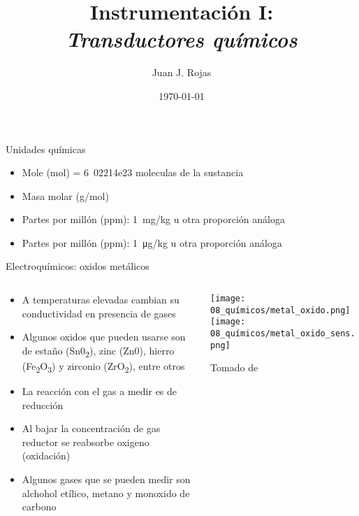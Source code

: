 \documentclass[aspectratio=169]{beamer}
\title{Instrumentación I: \\ \emph{Transductores químicos}}
\author{
    Juan J. Rojas
}
\institute{Instituto Tecnológico de Costa Rica}
\date{\today}
\begin{document}

\maketitle



\newcommand{\blackandwhite}{white} %

\begin{frame}[t]{Unidades químicas}
    \begin{itemize}
        \item Mole (mol) = \si{6.02214e23} moleculas de la sustancia
        \item Masa molar (\si{g/mol})
        \item Partes por millón (ppm): \SI{1}{\milli\gram/\kilo\gram} u otra proporción análoga
        \item Partes por millón (ppm): \SI{1}{\micro\gram/\kilo\gram} u otra proporción análoga
    \end{itemize}
\end{frame}

\begin{frame}{Electroquímicos: oxidos metálicos}
    \begin{columns}[T, onlytextwidth]
        \begin{column}{0.55\textwidth}
            \begin{itemize}
                \item A temperaturas elevadas cambian su conductividad en presencia de gases
                \item Algunos oxidos que pueden usarse son de estaño (Sn0\textsubscript{2}), zinc (Zn0), 
                hierro (Fe\textsubscript{2}O\textsubscript{3}) y zirconio (ZrO\textsubscript{2}), entre otros
                \item La reacción con el gas a medir es de reducción
                \item Al bajar la concentración de gas reductor se reabsorbe oxigeno (oxidación)
                \item Algunos gases que se pueden medir son alchohol etílico, metano y monoxido de carbono
            \end{itemize}
        \end{column}
        \begin{column}{0.45\textwidth}
        \centering
        \texttt{[image: 08\_químicos/metal\_oxido.png]}
        \vspace*{1cm}
        \texttt{[image: 08\_químicos/metal\_oxido\_sens.png]}

        \tiny{Tomado de \cite{ida2013sensors}}
        \end{column}
    \end{columns}
\end{frame}
\end{document}
